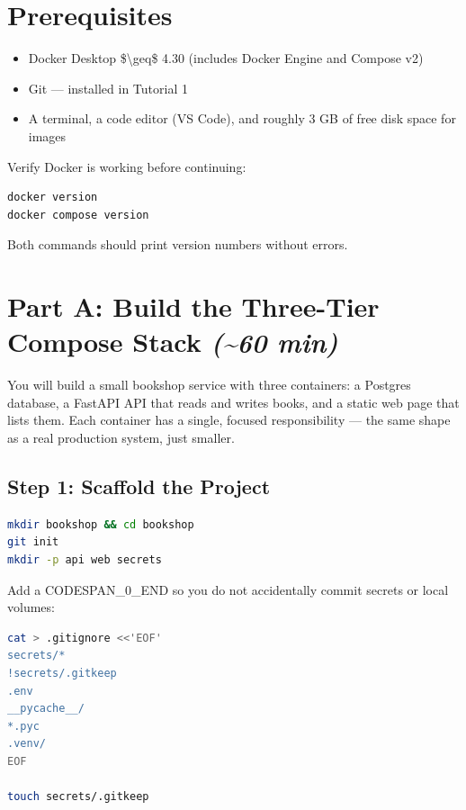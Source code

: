 \documentclass[11pt,a4paper]{book}
\begin{document}
\medskip

\section{Prerequisites}

\begin{itemize}
  \item Docker Desktop \$\textbackslash{}geq\$ 4.30 (includes Docker Engine and Compose v2)
  \item Git --- installed in Tutorial 1
  \item A terminal, a code editor (VS Code), and roughly 3 GB of free disk space for images
\end{itemize}

Verify Docker is working before continuing:

\begin{lstlisting}[language=Bash]
docker version
docker compose version
\end{lstlisting}

Both commands should print version numbers without errors.

\medskip

\section{Part A: Build the Three-Tier Compose Stack \textit{(\textasciitilde{}60 min)}}

You will build a small bookshop service with three containers: a Postgres database, a FastAPI API that reads and writes books, and a static web page that lists them. Each container has a single, focused responsibility --- the same shape as a real production system, just smaller.

\subsection{Step 1: Scaffold the Project}

\begin{lstlisting}[language=Bash]
mkdir bookshop && cd bookshop
git init
mkdir -p api web secrets
\end{lstlisting}

Add a CODESPAN\_0\_END so you do not accidentally commit secrets or local volumes:

\begin{lstlisting}[language=Bash]
cat > .gitignore <<'EOF'
secrets/*
!secrets/.gitkeep
.env
__pycache__/
*.pyc
.venv/
EOF

touch secrets/.gitkeep
\end{lstlisting}
\end{document}
